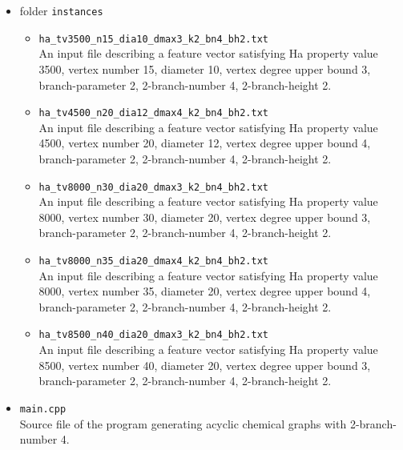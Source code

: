 \documentclass[11pt,titlepage,dvipdfmx,twoside]{article}
\begin{document}
\begin{itemize}
\begin{itemize}
\begin{itemize}
		\end{itemize}
	\item folder {\tt instances}
		\begin{itemize}
		
			\item{\tt ha\_tv3500\_n15\_dia10\_dmax3\_k2\_bn4\_bh2.txt}\\
				An input file describing a feature vector satisfying Ha property value 3500, 
				vertex number 15, diameter 10, vertex degree upper bound 3, branch-parameter 2,
				2-branch-number 4, 2-branch-height 2.
				
			\item{\tt ha\_tv4500\_n20\_dia12\_dmax4\_k2\_bn4\_bh2.txt}\\
				An input file describing a feature vector satisfying Ha property value 4500, 
				vertex number 20, diameter 12, vertex degree upper bound 4, branch-parameter 2,
				2-branch-number 4, 2-branch-height 2.
				
			\item{\tt ha\_tv8000\_n30\_dia20\_dmax3\_k2\_bn4\_bh2.txt}\\
				An input file describing a feature vector satisfying Ha property value 8000, 
				vertex number 30, diameter 20, vertex degree upper bound 3, branch-parameter 2,
				2-branch-number 4, 2-branch-height 2.
				
			\item{\tt ha\_tv8000\_n35\_dia20\_dmax4\_k2\_bn4\_bh2.txt}\\
				An input file describing a feature vector satisfying Ha property value 8000, 
				vertex number 35, diameter 20, vertex degree upper bound 4, branch-parameter 2,
				2-branch-number 4, 2-branch-height 2.
				
			\item{\tt ha\_tv8500\_n40\_dia20\_dmax3\_k2\_bn4\_bh2.txt}\\
				An input file describing a feature vector satisfying Ha property value 8500, 
				vertex number 40, diameter 20, vertex degree upper bound 3, branch-parameter 2,
				2-branch-number 4, 2-branch-height 2.

		\end{itemize}
	\item {\tt main.cpp}\\
	Source file of the program generating acyclic chemical graphs with 2-branch-number 4.
	\end{itemize}

\end{itemize}
\end{document}
